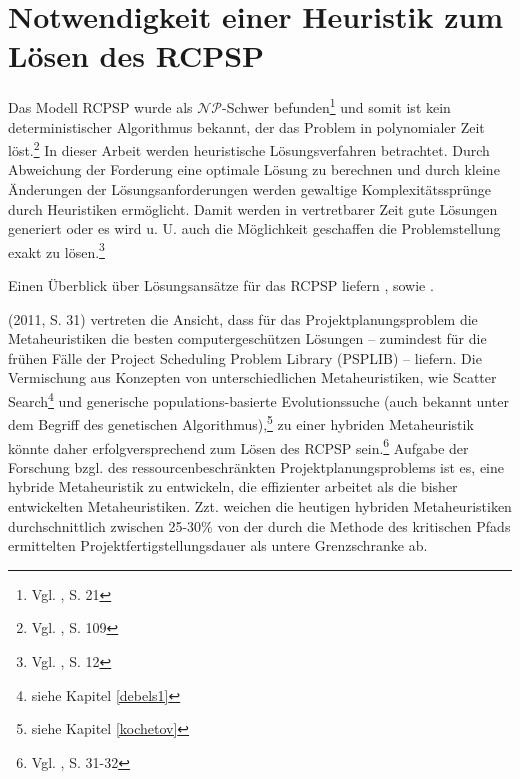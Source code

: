 \documentclass[a4paper,12pt,normalheadings,footexclude,headinclude,liststotoc,nochapterprefix,onecolumn,oneside,parskip,pointlessnumbers]{scrreprt}
\begin{document}
\section{Notwendigkeit einer Heuristik zum Lösen des RCPSP}\label{notwendig}
Das Modell RCPSP wurde als $\mathcal{NP}$-Schwer befunden\footnote{Vgl. \cite{blazewicz1983scheduling}, S. 21} und somit ist kein deterministischer Algorithmus bekannt, der das Problem in polynomialer Zeit löst.\footnote{Vgl. \cite{garey1979computers}, S. 109} In dieser Arbeit werden heuristische Lösungsverfahren betrachtet. %
Durch Abweichung der Forderung eine optimale Lösung zu berechnen und durch kleine Änderungen der Lösungsanforderungen werden gewaltige Komplexitäts\-sprünge durch Heuristiken ermöglicht. Damit werden in vertretbarer Zeit gute Lösungen generiert oder es wird u. U. auch die Möglichkeit geschaffen die Problemstellung exakt zu lösen.\footnote{Vgl. \cite{Hromkovic:2014aa}, S. 12}

Einen Überblick über Lösungsansätze für das RCPSP liefern \cite{demeulemeester2002project}, \cite{herroelen2005project} sowie \cite{kolisch2006experimental}. %

\citeauthor{demeulemeester2011robust} (2011, S. 31) vertreten die Ansicht, dass für das Projektplanungsproblem die Metaheuristiken die besten computergeschützen Lösungen -- zumindest für die frühen Fälle der Project Scheduling Problem Library (PSPLIB) -- liefern.
Die Vermischung aus Konzepten von unterschiedlichen Metaheuristiken, wie Scatter Search\footnote{siehe Kapitel \ref{debels1}} und generische populations-basierte Evolutionssuche (auch bekannt unter dem Begriff des genetischen Algorithmus),\footnote{siehe Kapitel \ref{kochetov}} zu einer hybriden Metaheuristik könnte daher erfolgversprechend zum Lösen des RCPSP sein.\footnote{Vgl. \cite{demeulemeester2011robust}, S. 31-32\label{demeulemeester}}
Aufgabe der Forschung bzgl. des ressourcenbeschränkten Projektplanungsproblems ist es, eine hybride Metaheuristik zu entwickeln, die effizienter arbeitet als die bisher entwickelten Metaheuristiken. Zzt. weichen die heutigen hybriden Metaheuristiken durchschnittlich zwischen 25-30\% von der durch die Methode des kritischen Pfads ermittelten Projektfertigstellungsdauer als untere Grenzschranke ab.
\end{document}
